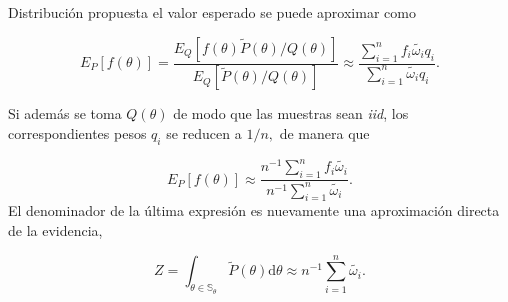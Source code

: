 \documentclass{beamer}
\begin{document}
\begin{frame}[allowframebreaks]{Distribución propuesta}
	el valor esperado se puede aproximar como
	
	$$E_P[f(\theta)]=\frac{E_Q[f(\theta)\tilde{P}(\theta)/Q(\theta)]}{E_Q[\tilde{P}(\theta)/Q(\theta)]}\approx \frac{\sum_{i=1}^n f_i\tilde{\omega_i}q_i}{\sum_{i=1}^n \tilde{\omega_i}q_i}.$$
	
	Si además se toma $Q(\theta)$ de modo que las muestras sean \textit{iid}, los correspondientes pesos $q_i$ se reducen a $1/n,$ de manera que
	
	$$E_P[f(\theta)]\approx \frac{n^{-1}\sum_{i=1}^n f_i\tilde{\omega_i}}{n^{-1}\sum_{i=1}^n \tilde{\omega_i}}.$$
	El denominador de la última expresión es nuevamente una aproximación directa de la evidencia,
	
	$$Z=\int_{\theta\in\mathbb{S}_\theta} \tilde{P}(\theta)\mathrm{d}\theta\approx n^{-1}\sum_{i=1}^n \tilde{\omega_i}.$$
	\end{frame}
\end{document}
